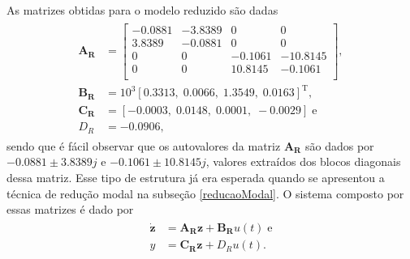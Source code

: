 As matrizes obtidas para o modelo reduzido são dadas \begin{align}
\begin{array}{ll}
	\mathbf{A_R} &= \left[\begin{array}{cccc}
		-0.0881  & -3.8389 &         0 &         0\\
    3.8389 &   -0.0881 &         0 &         0\\
         0 &         0 &   -0.1061 &  -10.8145\\
         0 &        0 &   10.8145 &   -0.1061\\
	\end{array}\right],\\
	\mathbf{B_R} &= 10^3\left[0.3313,\;
    0.0066,\;
    1.3549,\;
    0.0163\right]^{\mathrm{T}},\\
	\mathbf{C_R} &= \left[-0.0003,\;0.0148,\;0.0001,\;-0.0029\right]\;\mathrm{e}\\
	D_R &= -0.0906,
\end{array} \label{modeloReduzidoSemEpsilon}
\end{align} sendo que é fácil observar que os autovalores da matriz $\mathbf{A_R}$ são dados por $-0.0881\pm 3.8389j$ e $-0.1061\pm 10.8145j$, valores extraídos dos blocos diagonais dessa matriz. Esse tipo de estrutura já era esperada quando se apresentou a técnica de redução modal na subseção \ref{reducaoModal}. O sistema composto por essas matrizes é dado por \begin{align}
	\begin{array}{ll}
		\mathbf{\dot{z}} &= \mathbf{A_R}\mathbf{z} + \mathbf{B_R}u(t)\;\mathrm{e}\\
		y &= \mathbf{C_R}\mathbf{z} + D_Ru(t).
	\end{array}\label{modeloEspacoDeEstadosSemAtraso}
\end{align}


